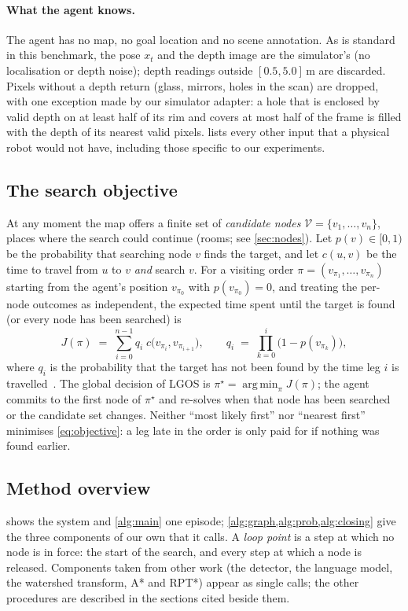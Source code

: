 \documentclass[10pt]{article}
\newcommand{\ours}{LGOS\xspace}
\newcommand{\m}{\,\mathrm{m}}
\newcommand{\Nodes}{\mathcal{V}}
\DeclareMathOperator*{\argmin}{arg\,min}
\begin{document}
\paragraph{What the agent knows.} The agent has no map, no goal location and
no scene annotation. As is standard in this benchmark, the pose $x_t$ and the
depth image are the simulator's (no localisation or depth noise); depth
readings outside $[0.5, 5.0]\m$ are discarded. Pixels without a depth return
(glass, mirrors, holes in the scan) are dropped, with one exception made by
our simulator adapter: a hole that is enclosed by valid depth on at least half
of its rim and covers at most half of the frame is filled with the depth of
its nearest valid pixels.  lists every other
input that a physical robot would not have, including those specific to our
experiments.

\subsection{The search objective}\label{sec:objective}
At any moment the map offers a finite set of \emph{candidate nodes}
$\Nodes=\{v_1,\dots,v_n\}$, places where the search could continue (rooms; see
\cref{sec:nodes}). Let $p(v)\in[0,1)$ be the probability that searching node
$v$ finds the target, and let $c(u,v)$ be the time to travel from $u$ to $v$
\emph{and} search $v$. For a visiting order $\pi=(v_{\pi_1},\dots,v_{\pi_n})$
starting from the agent's position $v_{\pi_0}$ with $p(v_{\pi_0})=0$, and
treating the per-node outcomes as independent, the expected time spent until
the target is found (or every node has been searched) is
\begin{equation}\label{eq:objective}
  J(\pi) \;=\; \sum_{i=0}^{n-1} q_i \; c\bigl(v_{\pi_i}, v_{\pi_{i+1}}\bigr),
  \qquad
  q_i \;=\; \prod_{k=0}^{i}\bigl(1-p(v_{\pi_k})\bigr),
\end{equation}
where $q_i$ is the probability that the target has not been found by the time
leg $i$ is travelled~\citep{lyu2026rpt}. The global decision of \ours is
$\pi^\star=\argmin_\pi J(\pi)$; the agent commits to the first node of
$\pi^\star$ and re-solves when that node has been searched or the candidate
set changes. Neither ``most likely first'' nor ``nearest first'' minimises
\cref{eq:objective}: a leg late in the order is only paid for if nothing was
found earlier.

\subsection{Method overview}\label{sec:overview}
 shows the system and \cref{alg:main} one episode;
\cref{alg:graph,alg:prob,alg:closing} give the three components of our own
that it calls. A \emph{loop point} is a step at which no node is in force: the
start of the search, and every step at which a node is released. Components
taken from other work (the detector, the language model, the watershed
transform, A* and RPT*) appear as single calls; the other procedures are
described in the sections cited beside them.
\end{document}
